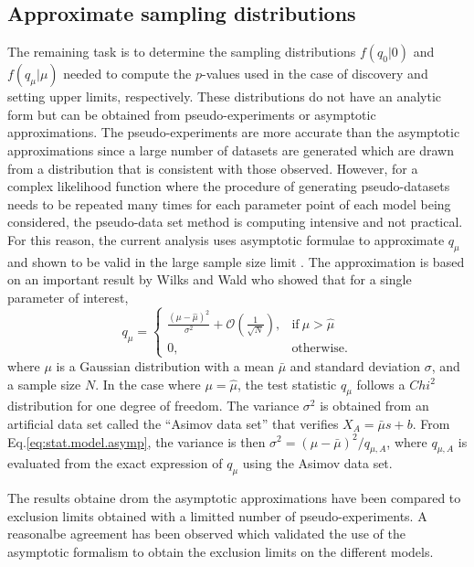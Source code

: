 \subsection*{Approximate sampling distributions}

The remaining task is to determine the sampling distributions
$f\left(q_{0} \rvert 0\right)$ and $f\left(q_{\mu} \rvert \mu\right)$
needed to compute the $p$-values
used in the case of discovery and setting upper limits, respectively.
These distributions do not have an analytic form but can be obtained from 
pseudo-experiments or asymptotic approximations.
The pseudo-experiments are more accurate than the asymptotic 
approximations since a large number of 
datasets are generated which are drawn from a distribution that is consistent 
with those observed.
However, for a complex likelihood function where the procedure of generating 
pseudo-datasets needs to be repeated many times for each parameter point
of each model being considered, the pseudo-data set method is computing 
intensive and not practical. For this reason, the current analysis 
uses asymptotic formulae to approximate $q_{\mu}$ and shown to be valid in the 
large sample size limit \cite{Cowan:2010js}. The approximation is based on an important result 
by Wilks \cite{Wilks:1938dza} and Wald \cite{Wald:ams1943} who showed that for a single parameter of interest,
\begin{equation}
  q_{\mu} =
  \begin{cases}
    \frac{\left(\mu - \hat{\mu}\right)^2}{\sigma^2} + \mathcal{O}\left(\frac{1}{\sqrt{N}}\right)
    , & \text{if}\ \mu > \hat{\mu} \\
    0, & \text{otherwise}.
  \end{cases}
\label{eq:stat.model.asymp}
\end{equation}
where $\mu$ is a Gaussian distribution with a mean $\bar{\mu}$ and 
standard deviation $\sigma$, and a sample size $N$. In the case where 
$\mu = \hat{\mu}$, the test statistic $q_{\mu}$ follows a $Chi^2$ distribution
for one degree of freedom. 
The variance $\sigma^2$ is obtained from an artificial data set called the 
``Asimov data set'' that verifies $X_A = \bar{\mu} s + b$. 
From Eq.\ref{eq:stat.model.asymp}, the variance is then 
$\sigma^2 = \left( \mu - \bar{\mu} \right)^2/q_{\mu,A}$, where $q_{\mu,A}$ 
is evaluated from the exact expression of $q_{\mu}$ using the Asimov data set.

The results obtaine drom the asymptotic approximations have been compared to 
exclusion limits obtained with a limitted number of pseudo-experiments.
A reasonalbe agreement has been observed which validated the use of 
the asymptotic formalism to obtain the exclusion limits on the different models.
